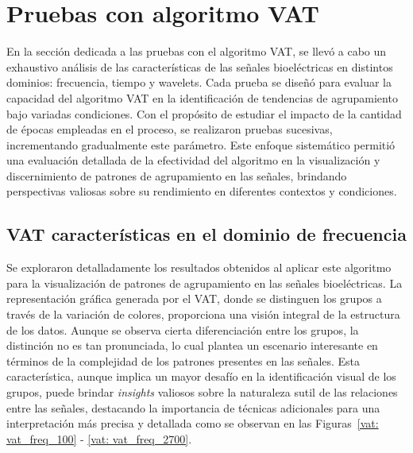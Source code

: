 \section{Pruebas con algoritmo VAT}
En la sección dedicada a las pruebas con el algoritmo VAT, se llevó a cabo un exhaustivo análisis de las características de las señales bioeléctricas en distintos dominios: frecuencia, tiempo y wavelets. Cada prueba se diseñó para evaluar la capacidad del algoritmo VAT en la identificación de tendencias de agrupamiento bajo variadas condiciones. Con el propósito de estudiar el impacto de la cantidad de épocas empleadas en el proceso, se realizaron pruebas sucesivas, incrementando gradualmente este parámetro. Este enfoque sistemático permitió una evaluación detallada de la efectividad del algoritmo en la visualización y discernimiento de patrones de agrupamiento en las señales, brindando perspectivas valiosas sobre su rendimiento en diferentes contextos y condiciones.

\subsection{VAT características en el dominio de frecuencia}
Se exploraron detalladamente los resultados obtenidos al aplicar este algoritmo para la visualización de patrones de agrupamiento en las señales bioeléctricas. La representación gráfica generada por el VAT, donde se distinguen los grupos a través de la variación de colores, proporciona una visión integral de la estructura de los datos. Aunque se observa cierta diferenciación entre los grupos, la distinción no es tan pronunciada, lo cual plantea un escenario interesante en términos de la complejidad de los patrones presentes en las señales. Esta característica, aunque implica un mayor desafío en la identificación visual de los grupos, puede brindar \textit{insights} valiosos sobre la naturaleza sutil de las relaciones entre las señales, destacando la importancia de técnicas adicionales para una interpretación más precisa y detallada como se observan en las Figuras~\ref{vat: vat_freq_100} - \ref{vat: vat_freq_2700}.

